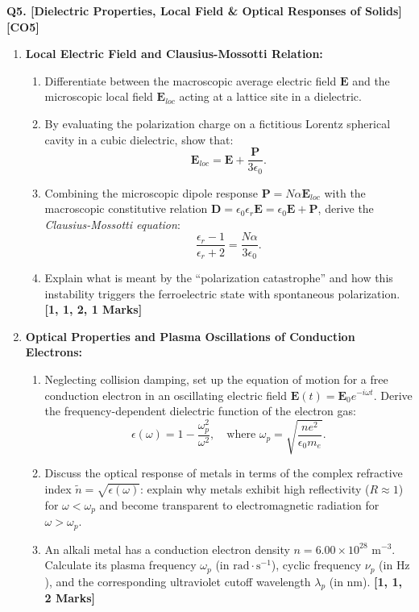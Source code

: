 \documentclass[11pt,a4paper]{article}
\begin{document}
\vspace{4pt}
\noindent\textbf{Q5. [Dielectric Properties, Local Field \& Optical Responses of Solids]} \hfill \textbf{[CO5]}
\begin{enumerate}[label=(\alph*),leftmargin=1.8em,itemsep=4pt]
    \item \textbf{Local Electric Field and Clausius-Mossotti Relation:}
    \begin{enumerate}[label=(\roman*),itemsep=1.5pt]
        \item Differentiate between the macroscopic average electric field $\mathbf{E}$ and the microscopic local field $\mathbf{E}_{loc}$ acting at a lattice site in a dielectric.
        \item By evaluating the polarization charge on a fictitious Lorentz spherical cavity in a cubic dielectric, show that:
        \[
        \mathbf{E}_{loc} = \mathbf{E} + \frac{\mathbf{P}}{3\epsilon_0}.
        \]
        \item Combining the microscopic dipole response $\mathbf{P} = N \alpha \mathbf{E}_{loc}$ with the macroscopic constitutive relation $\mathbf{D} = \epsilon_0 \epsilon_r \mathbf{E} = \epsilon_0 \mathbf{E} + \mathbf{P}$, derive the \textit{Clausius-Mossotti equation}:
        \[
        \frac{\epsilon_r - 1}{\epsilon_r + 2} = \frac{N \alpha}{3\epsilon_0}.
        \]
        \item Explain what is meant by the ``polarization catastrophe'' and how this instability triggers the ferroelectric state with spontaneous polarization. \hfill\textbf{[1, 1, 2, 1 Marks]}
    \end{enumerate}

    \item \textbf{Optical Properties and Plasma Oscillations of Conduction Electrons:}
    \begin{enumerate}[label=(\roman*),itemsep=1.5pt]
        \item Neglecting collision damping, set up the equation of motion for a free conduction electron in an oscillating electric field $\mathbf{E}(t) = \mathbf{E}_0 e^{-i\omega t}$. Derive the frequency-dependent dielectric function of the electron gas:
        \[
        \epsilon(\omega) = 1 - \frac{\omega_p^2}{\omega^2}, \quad \text{where } \omega_p = \sqrt{\frac{n e^2}{\epsilon_0 m_e}}.
        \]
        \item Discuss the optical response of metals in terms of the complex refractive index $\tilde{n} = \sqrt{\epsilon(\omega)}$: explain why metals exhibit high reflectivity ($R \approx 1$) for $\omega < \omega_p$ and become transparent to electromagnetic radiation for $\omega > \omega_p$.
        \item An alkali metal has a conduction electron density $n = 6.00 \times 10^{28}\text{ m}^{-3}$. Calculate its plasma frequency $\omega_p$ (in $\text{rad}\cdot\text{s}^{-1}$), cyclic frequency $\nu_p$ (in $\text{Hz}$), and the corresponding ultraviolet cutoff wavelength $\lambda_p$ (in nm). \hfill\textbf{[1, 1, 2 Marks]}
    \end{enumerate}
\end{enumerate}
\end{document}
